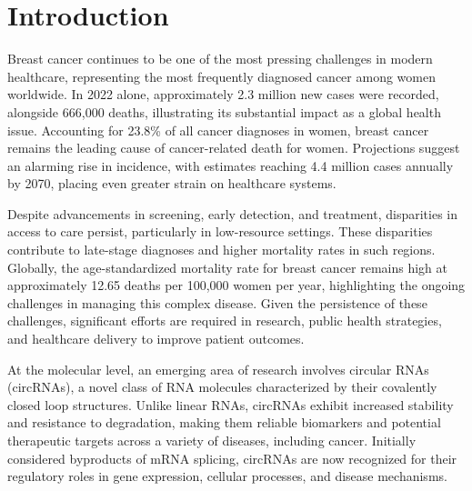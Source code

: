 \chapter{Introduction}

Breast cancer continues to be one of the most pressing challenges in modern
healthcare, representing the most frequently diagnosed cancer among women
worldwide.
In 2022 alone, approximately 2.3 million new cases were recorded, alongside
666,000 deaths, illustrating its substantial impact as a global health issue.
Accounting for 23.8\% of all cancer diagnoses in
women\supercite{bray_global_2024,ferlay_global_2024}, breast cancer remains the
leading cause of cancer-related death for women.
Projections suggest an alarming rise in incidence, with estimates reaching 4.4
million cases annually by 2070, placing even greater strain on healthcare
systems\supercite{lei_global_2021}.

Despite advancements in screening, early detection, and treatment, disparities
in access to care persist, particularly in low-resource settings.
These disparities contribute to late-stage diagnoses and higher mortality rates
in such regions\supercite{wilkinson_understanding_2022,ginsburg_breast_2020}.
Globally, the age-standardized mortality rate for breast cancer remains high at
approximately 12.65 deaths per 100,000 women per year, highlighting the ongoing
challenges in managing this complex
disease\supercite{bray_global_2024,ferlay_global_2024}.
Given the persistence of these challenges, significant efforts are required in
research, public health strategies, and healthcare delivery to improve patient
outcomes\supercite{desantis_breast_2019}.

At the molecular level, an emerging area of research involves circular RNAs
(circRNAs), a novel class of RNA molecules characterized by their covalently
closed loop structures.
Unlike linear RNAs, circRNAs exhibit increased stability and resistance to
degradation, making them reliable biomarkers and potential therapeutic targets
across a variety of diseases, including
cancer\supercite{ma_circular_2020,hoque_exploring_2023,wilusz_circular_2017}.
Initially considered byproducts of mRNA splicing, circRNAs are now recognized
for their regulatory roles in gene expression, cellular processes, and disease
mechanisms\supercite{cherubini_foxp1_2019,wilusz_360_2018}.

